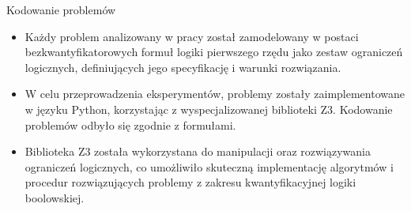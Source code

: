 \begin{frame}{Kodowanie problemów}
\begin{itemize}
\item Każdy problem analizowany w pracy został zamodelowany w postaci bezkwantyfikatorowych formuł logiki pierwszego rzędu jako zestaw ograniczeń logicznych, definiujących jego specyfikację i warunki rozwiązania.
\item W celu przeprowadzenia eksperymentów, problemy zostały zaimplementowane w języku Python, korzystając z wyspecjalizowanej biblioteki Z3. Kodowanie problemów odbyło się zgodnie z formułami.
\item Biblioteka Z3 została wykorzystana do manipulacji oraz rozwiązywania ograniczeń logicznych, co umożliwiło skuteczną implementację algorytmów i procedur rozwiązujących problemy z zakresu kwantyfikacyjnej logiki boolowskiej.
\end{itemize}
\end{frame}
